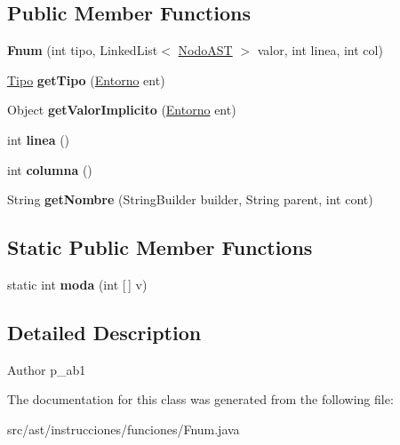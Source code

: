 \subsection*{Public Member Functions}
\begin{DoxyCompactItemize}
\item 
\mbox{\label{classast_1_1instrucciones_1_1funciones_1_1_fnum_adf2741c04f22e8e9006fb86240c54446}} 
{\bfseries Fnum} (int tipo, Linked\+List$<$ \mbox{\hyperlink{interfaceast_1_1_nodo_a_s_t}{Nodo\+A\+ST}} $>$ valor, int linea, int col)
\item 
\mbox{\label{classast_1_1instrucciones_1_1funciones_1_1_fnum_a34ffed52627de5c5d3d9eb53bbac0a94}} 
\mbox{\hyperlink{classentorno_1_1_tipo}{Tipo}} {\bfseries get\+Tipo} (\mbox{\hyperlink{classentorno_1_1_entorno}{Entorno}} ent)
\item 
\mbox{\label{classast_1_1instrucciones_1_1funciones_1_1_fnum_a78ac3f050bc27ce8487ea4b8c2673619}} 
Object {\bfseries get\+Valor\+Implicito} (\mbox{\hyperlink{classentorno_1_1_entorno}{Entorno}} ent)
\item 
\mbox{\label{classast_1_1instrucciones_1_1funciones_1_1_fnum_a9b96b33766dbc222ead407a663fafaec}} 
int {\bfseries linea} ()
\item 
\mbox{\label{classast_1_1instrucciones_1_1funciones_1_1_fnum_a9013c4466ea5ab3ecaf1885a0fa16362}} 
int {\bfseries columna} ()
\item 
\mbox{\label{classast_1_1instrucciones_1_1funciones_1_1_fnum_ad246b9492ae3103547081771ed2c3ec4}} 
String {\bfseries get\+Nombre} (String\+Builder builder, String parent, int cont)
\end{DoxyCompactItemize}
\subsection*{Static Public Member Functions}
\begin{DoxyCompactItemize}
\item 
\mbox{\label{classast_1_1instrucciones_1_1funciones_1_1_fnum_a8a5ae0d66ec8be0b929676047bae2194}} 
static int {\bfseries moda} (int \mbox{[}$\,$\mbox{]} v)
\end{DoxyCompactItemize}


\subsection{Detailed Description}
\begin{DoxyAuthor}{Author}
p\+\_\+ab1 
\end{DoxyAuthor}


The documentation for this class was generated from the following file\+:\begin{DoxyCompactItemize}
\item 
src/ast/instrucciones/funciones/Fnum.\+java\end{DoxyCompactItemize}
